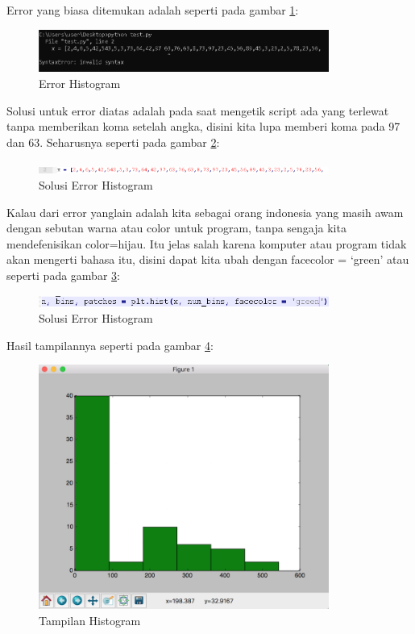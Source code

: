 Error yang biasa ditemukan adalah seperti pada gambar \ref{fig:errhisto}:
\begin{figure}[!htbp]
	\centerline{\includegraphics[width=0.85\textwidth]{figures/6/errhisto.PNG}}
	\caption{Error Histogram}
	\label{fig:errhisto}
\end{figure}       

Solusi untuk error diatas adalah pada saat mengetik script ada yang terlewat tanpa memberikan koma setelah angka, disini kita lupa memberi koma pada 97 dan 63. Seharusnya seperti pada gambar \ref{fig:solhisto}:
\begin{figure}[!htbp]
	\centerline{\includegraphics[width=0.85\textwidth]{figures/6/solhisto.PNG}}
	\caption{Solusi Error Histogram}
	\label{fig:solhisto}
\end{figure}      

Kalau dari error yanglain adalah kita sebagai orang indonesia yang masih awam dengan sebutan warna atau color untuk program, tanpa sengaja kita mendefenisikan color=hijau. Itu jelas salah karena komputer atau program tidak akan mengerti bahasa itu, disini dapat kita ubah dengan facecolor = ‘green’ atau seperti pada gambar \ref{fig:solhistogrm}:
\begin{figure}[!htbp]
	\centerline{\includegraphics[width=0.85\textwidth]{figures/6/solhistogrm.PNG}}
	\caption{Solusi Error Histogram}
	\label{fig:solhistogrm}
\end{figure}      

Hasil tampilannya seperti pada gambar \ref{fig:showhisto}:
\begin{figure}[!htbp]
	\centerline{\includegraphics[width=0.85\textwidth]{figures/6/showhisto.PNG}}
	\caption{Tampilan Histogram}
	\label{fig:showhisto}
\end{figure} 

